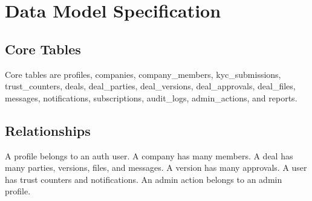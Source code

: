 \chapter{Data Model Specification}
\section{Core Tables}
Core tables are profiles, companies, company\_members, kyc\_submissions, trust\_counters, deals, deal\_parties, deal\_versions, deal\_approvals, deal\_files, messages, notifications, subscriptions, audit\_logs, admin\_actions, and reports.
\section{Relationships}
A profile belongs to an auth user. A company has many members. A deal has many parties, versions, files, and messages. A version has many approvals. A user has trust counters and notifications. An admin action belongs to an admin profile.

